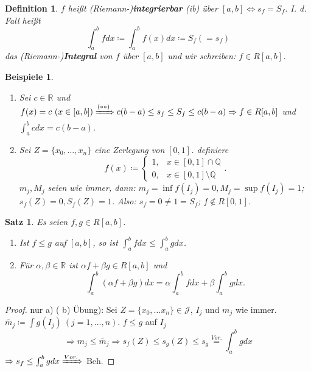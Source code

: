 \documentclass[titlepage,ngerman,a4paper,headsepline]{scrartcl}
\newcommand{\Q}{\mathbb{Q}}
\newcommand{\R}{\mathbb{R}}
\theoremstyle{named}
\theoremstyle{dotless}
\newtheorem{satz}[namedtheorem]{Satz}
\newtheorem*{beispiele}{Beispiele}
\newtheorem*{definition}{Definition}
\begin{document}
   
\begin{definition}
	$f$ hei{\ss}t (Riemann-)\textbf{integrierbar} (ib) über $[a, b] \iff s_{f} = S_{f}$. I. d. Fall hei{\ss}t
		$$ \int_{a}^{b} f dx \coloneqq \int_{a}^{b} f(x) dx \coloneqq S_{f} (= s_{f}) $$
	das (Riemann-)\textbf{Integral}	von $f$ über $[a, b]$ und wir schreiben: $f \in R[a, b]$.
\end{definition}


\begin{beispiele} ~\
	\begin{enumerate}
		\item Sei $c \in \R$ und $f(x) = c ~(x \in [a, b]) \xRightarrow[]{(**)} c (b - a) \leq s_{f} \leq S_{f} \leq c(b- a) \Rightarrow f \in R[a, b]$ und $\int_{a}^{b}c dx = c(b - a)$.
		\item Sei $Z = \{ x_{0}, \dotsc, x_{n} \}$ eine Zerlegung von $[0, 1]$. definiere
			$$ f(x) \coloneqq \begin{cases} 1, & x \in [0, 1] \cap \Q \\ 0, & x \in [0, 1] \setminus \Q \end{cases}. $$  
			$m_{j}, M_{j}$ seien wie immer, dann: $m_{j} = \inf f(I_{j}) = 0, M_{j} = \sup f(I_{j}) = 1$; $s_{f}(Z) = 0, S_{f}(Z) = 1$. Also: $s_{f} = 0 \neq 1 = S_{f}$; $f \notin R[0, 1]$.
	\end{enumerate}	
\end{beispiele}

\begin{satz} \label{10.2:satz}
	Es seien $f, g \in R[a, b]$.
	\begin{enumerate}
		\item Ist $f \leq g$ auf $[a, b]$, so ist $\int_{a}^{b} f dx \leq \int_{a}^{b} g dx$.
		\item Für $\alpha, \beta \in \R$ ist $\alpha f + \beta g \in R[a, b]$ und
			$$ \int_{a}^{b} (\alpha f + \beta g) dx = \alpha \int_{a}^{b} f dx + \beta \int_{a}^{b} g dx. $$
	\end{enumerate}
\end{satz}

\begin{proof}
	nur a) ( b) Übung): Sei $Z = \{ x_{0}, \dotsc x_{n} \} \in \mathcal{J}$, $I_{j}$ und $m_{j}$ wie immer. $\tilde{m_{j}} \coloneqq \int g(I_{j}) ~(j = 1, \dotsc, n)$. $f \leq g$ auf $I_{j}$
		$$ \Rightarrow m_{j} \leq \tilde{m_{j}} \Rightarrow s_{f}(Z) \leq s_{g}(Z) \leq s_{g} \overset{Vor.}{=} \int_{a}^{b} g dx $$ 
		$\Rightarrow s_{f} \leq \int_{a}^{b} g dx \xRightarrow[]{Vor.}$ Beh.
\end{proof}
\end{document}
